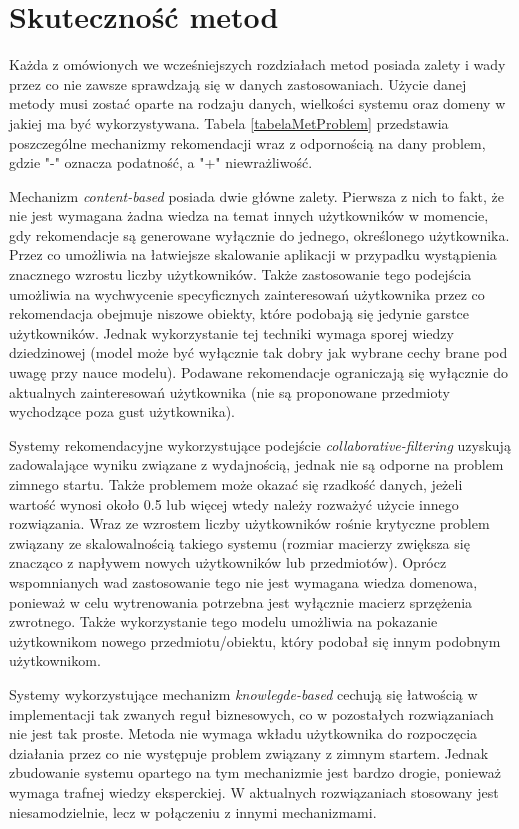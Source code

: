\section{Skuteczność metod}

Każda z omówionych we wcześniejszych rozdziałach metod posiada zalety i wady przez co nie zawsze sprawdzają się w danych zastosowaniach. Użycie danej metody musi zostać oparte na rodzaju danych, wielkości systemu oraz domeny w jakiej ma być wykorzystywana. Tabela \ref{tabelaMetProblem} przedstawia poszczególne mechanizmy rekomendacji wraz z odpornością na dany problem, gdzie "-" oznacza podatność, a "+" niewrażliwość.

Mechanizm \textit{content-based} posiada dwie główne zalety. Pierwsza z nich to fakt, że nie jest wymagana żadna wiedza na temat innych użytkowników w momencie, gdy rekomendacje są generowane wyłącznie do jednego, określonego użytkownika. Przez co umożliwia na łatwiejsze skalowanie aplikacji w przypadku wystąpienia znacznego wzrostu liczby użytkowników. Także zastosowanie tego podejścia umożliwia na wychwycenie specyficznych zainteresowań użytkownika przez co rekomendacja obejmuje niszowe obiekty, które podobają się jedynie garstce użytkowników. Jednak wykorzystanie tej techniki wymaga sporej wiedzy dziedzinowej (model może być wyłącznie tak dobry jak wybrane cechy brane pod uwagę przy nauce modelu). Podawane rekomendacje ograniczają się wyłącznie do aktualnych zainteresowań użytkownika (nie są proponowane przedmioty wychodzące poza gust użytkownika).

Systemy rekomendacyjne wykorzystujące podejście \textit{collaborative-filtering} uzyskują zadowalające wyniku związane z wydajnością, jednak nie są odporne na problem zimnego startu. Także problemem może okazać się rzadkość danych, jeżeli wartość wynosi około 0.5 lub więcej wtedy należy rozważyć użycie innego rozwiązania. Wraz ze wzrostem liczby użytkowników rośnie krytyczne problem związany ze skalowalnością takiego systemu (rozmiar macierzy zwiększa się znacząco z napływem nowych użytkowników lub przedmiotów). Oprócz wspomnianych wad zastosowanie tego nie jest wymagana wiedza domenowa, ponieważ w celu wytrenowania potrzebna jest wyłącznie macierz sprzężenia zwrotnego. Także wykorzystanie tego modelu umożliwia na pokazanie użytkownikom nowego przedmiotu/obiektu, który podobał się innym podobnym użytkownikom.

Systemy wykorzystujące mechanizm \textit{knowlegde-based} cechują się łatwością w implementacji tak zwanych reguł biznesowych, co w pozostałych rozwiązaniach nie jest tak proste. Metoda nie wymaga wkładu użytkownika do rozpoczęcia działania przez co nie występuje problem związany z zimnym startem. Jednak zbudowanie systemu opartego na tym mechanizmie jest bardzo drogie, ponieważ wymaga trafnej wiedzy eksperckiej. W aktualnych rozwiązaniach stosowany jest niesamodzielnie, lecz w połączeniu z innymi mechanizmami.  \cite{reviewCurrentRS}

